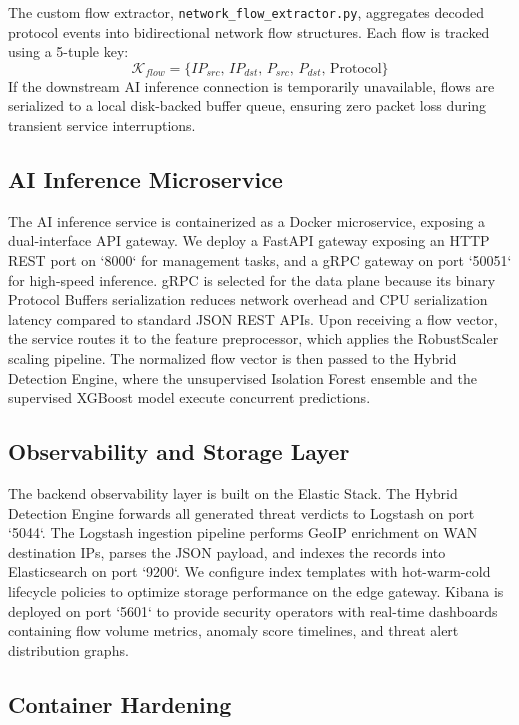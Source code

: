 \documentclass[journal]{IEEEtran}
\begin{document}
The custom flow extractor, \texttt{network\_flow\_extractor.py},
aggregates decoded protocol events into bidirectional network
flow structures. Each flow is tracked using a 5-tuple key:
\begin{equation}
  \mathcal{K}_{flow} = \{IP_{src},\, IP_{dst},\, P_{src},\, P_{dst},\, \text{Protocol}\}
\end{equation}
If the downstream AI inference connection is temporarily
unavailable, flows are serialized to a local disk-backed buffer
queue, ensuring zero packet loss during transient service
interruptions.

\subsection{AI Inference Microservice}
The AI inference service is containerized as a Docker microservice, exposing a dual-interface API gateway. We deploy a FastAPI gateway exposing an HTTP REST port on `8000` for management tasks, and a gRPC gateway on port `50051` for high-speed inference. gRPC is selected for the data plane because its binary Protocol Buffers serialization reduces network overhead and CPU serialization latency compared to standard JSON REST APIs. Upon receiving a flow vector, the service routes it to the feature preprocessor, which applies the RobustScaler scaling pipeline. The normalized flow vector is then passed to the Hybrid Detection Engine, where the unsupervised Isolation Forest ensemble and the supervised XGBoost model execute concurrent predictions.

\subsection{Observability and Storage Layer}
The backend observability layer is built on the Elastic Stack. The Hybrid Detection Engine forwards all generated threat verdicts to Logstash on port `5044`. The Logstash ingestion pipeline performs GeoIP enrichment on WAN destination IPs, parses the JSON payload, and indexes the records into Elasticsearch on port `9200`. We configure index templates with hot-warm-cold lifecycle policies to optimize storage performance on the edge gateway. Kibana is deployed on port `5601` to provide security operators with real-time dashboards containing flow volume metrics, anomaly score timelines, and threat alert distribution graphs.

\subsection{Container Hardening}
\end{document}

